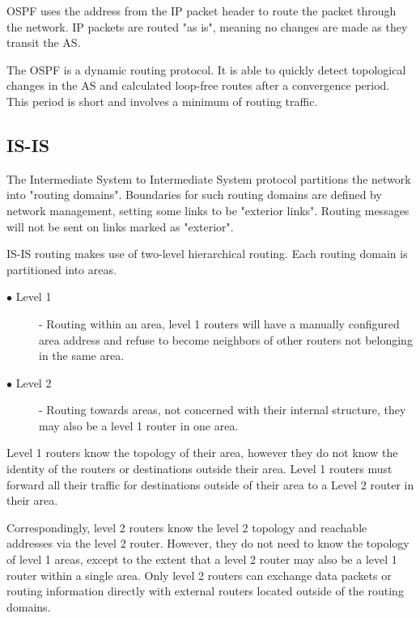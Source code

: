 \documentclass[a4paper, 11pt, UTF8]{article}
\begin{document}
OSPF uses the address from the IP packet header to route the packet through the network.
IP packets are routed "as is", meaning no changes are made as they transit the AS.

The OSPF is a dynamic routing protocol.
It is able to quickly detect topological changes in the AS and calculated loop-free routes after a convergence period.
This period is short and involves a minimum of routing traffic.\cite{J.Moy1998}

\subsection{IS-IS}
The Intermediate System to Intermediate System protocol partitions the network into "routing domains".
Boundaries for such routing domains are defined by network management, setting some links to be "exterior links".
Routing messages will not be sent on links marked as "exterior".

IS-IS routing makes use of two-level hierarchical routing. 
Each routing domain is partitioned into areas.
\begin{description}
  \item[$\bullet$ Level 1] - Routing within an area, level 1 routers will have a manually configured area address and refuse to become neighbors of other routers not belonging in the same area.
  \item[$\bullet$ Level 2] - Routing towards areas, not concerned with their internal structure, they may also be a level 1 router in one area.
\end{description}

Level 1 routers know the topology of their area, however they do not know the identity of the routers or destinations outside their area.
Level 1 routers must forward all their traffic for destinations outside of their area to a Level 2 router in their area.

Correspondingly, level 2 routers know the level 2 topology and reachable addresses via the level 2 router.
However, they do not need to know the topology of level 1 areas, except to the extent that a level 2 router may also be a level 1 router within a single area.
Only level 2 routers can exchange data packets or routing information directly with external routers located outside of the routing domains.\cite{Callon1990}

\



\end{document}
